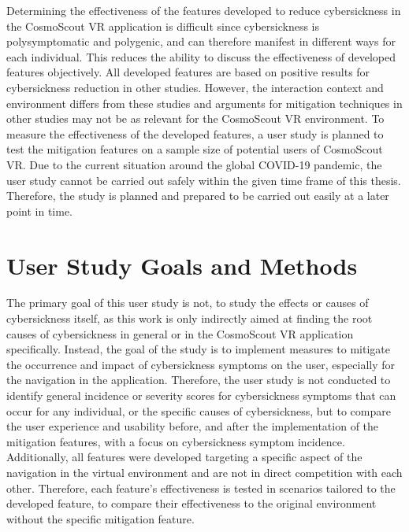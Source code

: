 Determining the effectiveness of the features developed to reduce cybersickness in the CosmoScout VR application is
difficult since cybersickness is polysymptomatic and polygenic, and can therefore manifest in different ways for each
individual.
This reduces the ability to discuss the effectiveness of developed features objectively.
All developed features are based on positive results for cybersickness reduction in other studies.
However, the interaction context and environment differs from these studies and arguments for mitigation techniques
in other studies may not be as relevant for the CosmoScout VR environment.
To measure the effectiveness of the developed features, a user study is planned to test the mitigation features on a
sample size of potential users of CosmoScout VR\@.
Due to the current situation around the global COVID-19 pandemic, the user study cannot be carried out safely within
the given time frame of this thesis.
Therefore, the study is planned and prepared to be carried out easily at a later point in time.


\section{User Study Goals and Methods}\label{sec:user-study-goals-and-methods}

The primary goal of this user study is not, to study the effects or causes of cybersickness itself, as this work is
only indirectly aimed at finding the root causes of cybersickness in general or in the CosmoScout VR application
specifically.
Instead, the goal of the study is to implement measures to mitigate the occurrence and impact of cybersickness
symptoms on the user, especially for the navigation in the application.
Therefore, the user study is not conducted to identify general incidence or severity scores for cybersickness symptoms
that can occur for any individual, or the specific causes of cybersickness, but to compare the user experience and
usability before, and after the implementation of the mitigation features, with a focus on cybersickness symptom
incidence.
Additionally, all features were developed targeting a specific aspect of the navigation in the virtual environment
and are not in direct competition with each other.
Therefore, each feature's effectiveness is tested in scenarios tailored to the developed feature, to compare their
effectiveness to the original environment without the specific mitigation feature.

